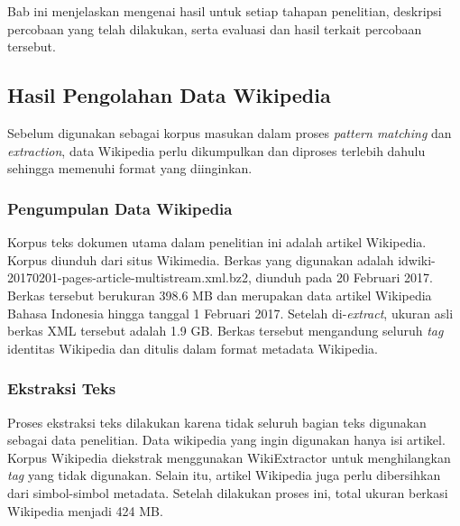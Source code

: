 \chapter{\babLima}
Bab ini menjelaskan mengenai hasil untuk setiap tahapan penelitian, deskripsi percobaan yang telah dilakukan, serta evaluasi dan hasil terkait percobaan tersebut.

\section{Hasil Pengolahan Data Wikipedia}
Sebelum digunakan sebagai korpus masukan dalam proses \textit{pattern matching} dan \textit{extraction}, data Wikipedia perlu dikumpulkan dan diproses terlebih dahulu sehingga memenuhi format yang diinginkan.

\subsection{Pengumpulan Data Wikipedia}
Korpus teks dokumen utama dalam penelitian ini adalah artikel Wikipedia. Korpus diunduh dari situs Wikimedia. Berkas yang digunakan adalah idwiki-20170201-pages-article-multistream.xml.bz2, diunduh pada 20 Februari 2017. Berkas tersebut berukuran 398.6 MB dan merupakan data artikel Wikipedia Bahasa Indonesia hingga tanggal 1 Februari 2017. Setelah di-\textit{extract}, ukuran asli berkas XML tersebut adalah 1.9 GB. Berkas tersebut mengandung seluruh \textit{tag} identitas Wikipedia dan ditulis dalam format metadata Wikipedia. 

\subsection{Ekstraksi Teks}
Proses ekstraksi teks dilakukan karena tidak seluruh bagian teks digunakan sebagai data penelitian. Data wikipedia yang ingin digunakan hanya isi artikel. Korpus Wikipedia diekstrak menggunakan WikiExtractor untuk menghilangkan \textit{tag} yang tidak digunakan. Selain itu, artikel Wikipedia juga perlu dibersihkan dari simbol-simbol metadata. Setelah dilakukan proses ini, total ukuran berkasi Wikipedia menjadi 424 MB.

